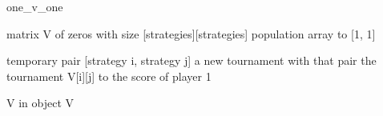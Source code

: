 \begin{algorithm}
\caption{one\_v\_one}
\begin{algorithmic}[1]


\StateCreate matrix V of zeros with size [strategies][strategies]  
\StateSet population array to [1, 1]

        \StateCreate temporary pair [strategy i, strategy j]  
        \StateInitialize a new tournament with that pair  
        \StateRun the tournament  
        \StateSet V[i][j] to the score of player 1  
    \EndFor
\EndFor

\StateStore V in object  
\return V

\Endfunction

\end{algorithmic}
\end{algorithm}